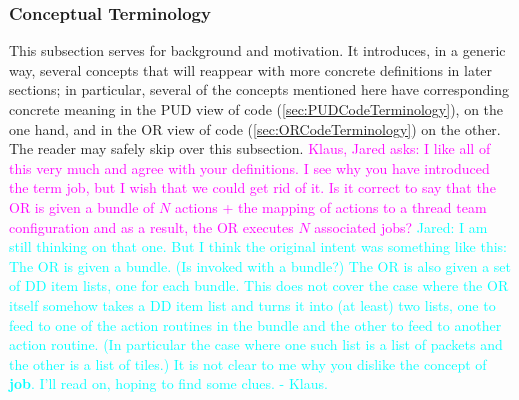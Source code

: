 \documentclass{article}
\newcommand{\JaredRfromKW}[1]   {\textcolor{cyan}{Jared: #1 - Klaus.}}
\newcommand{\KlausQfromJO}[1]   {\textcolor{magenta}{Klaus, Jared asks: #1}}
\newcommand{\shortPUD}   {PUD\xspace}
\newcommand{\shortOR}   {OR\xspace}
\newcommand{\PUD}    {\shortPUD}
\newcommand{\OR}        {\shortOR}
\begin{document}
\subsubsection{Conceptual Terminology}
This subsection serves for background and motivation.
It introduces, in a generic way, several concepts that will
reappear with more concrete definitions in later sections;
in particular, several of the concepts mentioned here have
corresponding concrete meaning in the \PUD view of code (\ref{sec:PUDCodeTerminology}), on the one hand,
and in the \OR view of code (\ref{sec:ORCodeTerminology}) on the other.
The reader may safely skip over this subsection.
\KlausQfromJO{I like all of this very much and agree with your definitions.  I
see why you have introduced the term job, but I wish that we could get rid of
it.  Is it correct to say that the \OR is given a bundle of $N$ actions + the
mapping of actions to a thread team configuration and as a result, the \OR
executes $N$ associated jobs?}
\JaredRfromKW{
I am still thinking on that one.
But I think the original intent was something like this:
The \OR is given a bundle. (Is invoked with a bundle?)
The \OR is also given a set of DD item lists, one for each bundle.
This does not cover the case where the \OR itself somehow
takes a DD item list and turns it into (at least) two lists,
one to feed to one of the action routines in the bundle
and the other to feed to another action routine.
(In particular the case where one such list is a list of packets
and the other is a list of tiles.)
It is not clear to me why you dislike the concept of \textbf{job}.
I'll read on, hoping to find some clues.
}
\\
\end{document}
